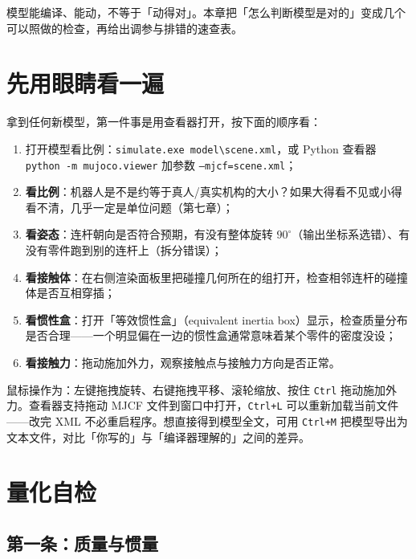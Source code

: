 
模型能编译、能动，不等于「动得对」。本章把「怎么判断模型是对的」变成几个可以照做的检查，再给出调参与排错的速查表。

\section{先用眼睛看一遍}

拿到任何新模型，第一件事是用查看器打开，按下面的顺序看：

\begin{enumerate}
	\item 打开模型看比例：\texttt{simulate.exe model\textbackslash{}scene.xml}，或 Python 查看器 \texttt{python -m mujoco.viewer} 加参数 \texttt{--mjcf=scene.xml}；
	\item \textbf{看比例}：机器人是不是约等于真人/真实机构的大小？如果大得看不见或小得看不清，几乎一定是单位问题（第七章）；
	\item \textbf{看姿态}：连杆朝向是否符合预期，有没有整体旋转 $90^\circ$（输出坐标系选错）、有没有零件跑到别的连杆上（拆分错误）；
	\item \textbf{看接触体}：在右侧渲染面板里把碰撞几何所在的组打开，检查相邻连杆的碰撞体是否互相穿插；
	\item \textbf{看惯性盒}：打开「等效惯性盒」（equivalent inertia box）显示，检查质量分布是否合理——一个明显偏在一边的惯性盒通常意味着某个零件的密度没设；
	\item \textbf{看接触力}：拖动施加外力，观察接触点与接触力方向是否正常。
\end{enumerate}

鼠标操作为：左键拖拽旋转、右键拖拽平移、滚轮缩放、按住 \texttt{Ctrl} 拖动施加外力。查看器支持拖动 MJCF 文件到窗口中打开，\texttt{Ctrl+L} 可以重新加载当前文件——改完 XML 不必重启程序。想直接得到模型全文，可用 \texttt{Ctrl+M} 把模型导出为文本文件，对比「你写的」与「编译器理解的」之间的差异。

\section{量化自检}

\subsection{第一条：质量与惯量}

